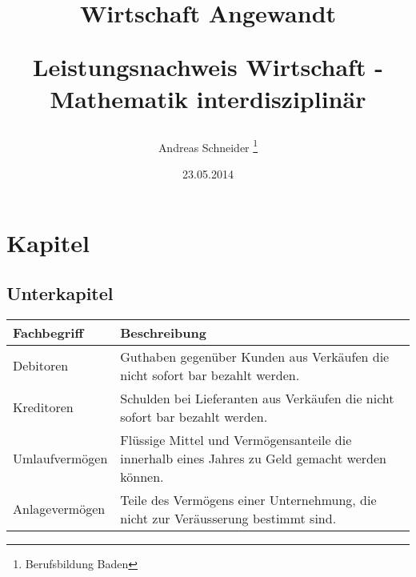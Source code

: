\documentclass[11pt, twocolumn, a4paper]{scrartcl}
\title{Wirtschaft Angewandt\\
\begin{large}Leistungsnachweis Wirtschaft - Mathematik interdisziplin{\"a}r\end{large}}
\date{23.05.2014}
\author{Andreas Schneider \thanks{Berufsbildung Baden}}
\begin{document}
\maketitle
\begin{small}
\setcounter{tocdepth}{1}
\tableofcontents 
\end{small}




\section{Kapitel} %
\label{sec:Einleitung}%



\subsection{Unterkapitel}%


\begin{tabular}{p{3cm}p{3cm}}
\toprule
\textbf{Fachbegriff} & \textbf{Beschreibung} \\
\midrule
Debitoren&Guthaben gegenüber Kunden aus Verkäufen die nicht sofort bar bezahlt werden.\\
\midrule
Kreditoren&Schulden bei Lieferanten aus Verkäufen die nicht sofort bar bezahlt werden.\\
\midrule
Umlaufvermögen& Flüssige Mittel und Vermögensanteile die innerhalb eines Jahres zu Geld gemacht werden können.\\
\midrule
Anlagevermögen&Teile des Vermögens einer Unternehmung, die nicht zur Veräusserung bestimmt sind.\\
\bottomrule
\end{tabular}
\end{document}
